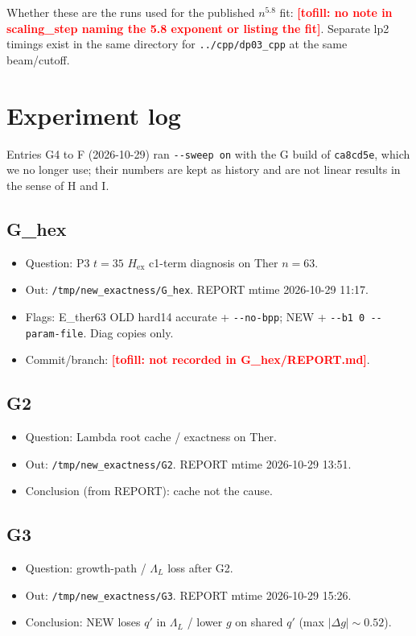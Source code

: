 \documentclass[11pt]{article}
\newcommand{\tofill}[1]{\textcolor{red}{\textbf{[tofill: #1]}}}
\begin{document}
Whether these are the runs used for the published $n^{5.8}$ fit: \tofill{no note in scaling\_step naming the 5.8 exponent or listing the fit}. Separate lp2 timings exist in the same directory for \texttt{../cpp/dp03\_cpp} at the same beam/cutoff.

\section{Experiment log}
Entries G4 to F (2026-10-29) ran \texttt{-{}-sweep on} with the G build of \texttt{ca8cd5e}, which we no longer use; their numbers are kept as history and are not linear results in the sense of H and I.

\subsection{G\_hex}
\begin{itemize}[leftmargin=*]
  \item Question: P3 $t{=}35$ $H_{\mathrm{ex}}$ c1-term diagnosis on Ther $n{=}63$.
  \item Out: \texttt{/tmp/new\_exactness/G\_hex}. REPORT mtime 2026-10-29 11:17.
  \item Flags: E\_ther63 OLD hard14 accurate + \texttt{-{}-no-bpp}; NEW + \texttt{-{}-b1 0 -{}-param-file}. Diag copies only.
  \item Commit/branch: \tofill{not recorded in G\_hex/REPORT.md}.
\end{itemize}

\subsection{G2}
\begin{itemize}[leftmargin=*]
  \item Question: Lambda root cache / exactness on Ther.
  \item Out: \texttt{/tmp/new\_exactness/G2}. REPORT mtime 2026-10-29 13:51.
  \item Conclusion (from REPORT): cache not the cause.
\end{itemize}

\subsection{G3}
\begin{itemize}[leftmargin=*]
  \item Question: growth-path / $\Lambda_L$ loss after G2.
  \item Out: \texttt{/tmp/new\_exactness/G3}. REPORT mtime 2026-10-29 15:26.
  \item Conclusion: NEW loses $q'$ in $\Lambda_L$ / lower $g$ on shared $q'$ (max $|\Delta g|{\sim}0.52$).
\end{itemize}
\end{document}
